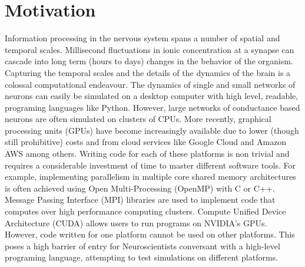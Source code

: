 \documentclass[10pt,letterpaper]{article}
\begin{document}


\linenumbers

\section*{Motivation}
Information processing in the nervous system spans a number of spatial and temporal scales. Millisecond fluctuations in ionic concentration at a synapse can cascade into long term (hours to days) changes in the behavior of the organism. Capturing the temporal scales and the details of the dynamics of the brain is a colossal computational endeavour. The dynamics of single and small networks of neurons can easily be simulated on a desktop computer with high level, readable, programing languages like Python. However, large networks of conductance based neurons are often simulated on clusters of CPUs. More recently, graphical processing units (GPUs) have become increasingly available due to lower (though still prohibitive) costs and from cloud services like Google Cloud and Amazon AWS among others. Writing code for each of these platforms is non trivial and requires a considerable investment of time to master different software tools. For example, implementing parallelism in multiple core shared memory architectures is often achieved using Open Multi-Processing (OpenMP) with C or C++. Message Passing Interface (MPI) libraries are used to implement code that computes over high performance computing clusters. Compute Unified Device Architecture (CUDA) allows users to run programs on NVIDIA's GPUs. However, code written for one platform cannot be used on other platforms. This poses a high barrier of entry for Neuroscientists conversant with a high-level programing language, attempting to test simulations on different platforms. 
\end{document}
